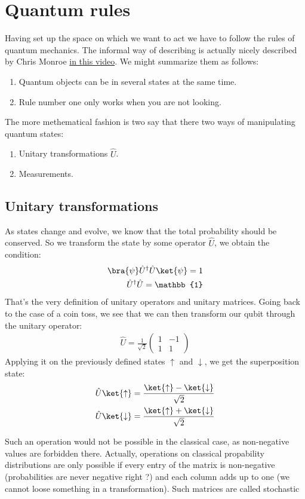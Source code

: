 \section{Quantum rules}
Having set up the space on which we want to act we have to follow the rules of quantum mechanics. The informal way of describing is actually nicely described by Chris Monroe \href{https://youtu.be/CC7nlBM2cSM}{in this video}. We might summarize them as follows:
\begin{enumerate}
\item Quantum objects can be in several states at the same time.
\item Rule number one only works when you are not looking.
\end{enumerate}

The more methematical fashion is two say that there two ways of manipulating quantum states:
\begin{enumerate}
\item Unitary transformations $\hat{U}$.
\item Measurements.
\end{enumerate}

\subsection{Unitary transformations}
As states change and evolve, we know that the total probability should be conserved. So we transform the state by some operator $\hat{U}$, we obtain the condition:
\begin{align}
\bra{\psi}\hat{U}^\dag\hat{U} \ket{\psi} = 1\\
\hat{U}^\dag\hat{U}  = \mathbb{1}
\end{align}
That's the very definition of unitary operators and unitary matrices.
Going back to the case of a coin toss, we see that we can then transform our qubit through the unitary operator:
\begin{align}
\hat{U}=\frac{1}{\sqrt{2}}\left(\begin{array}{cc}
1 & -1\\
1 & 1
\end{array}\right)
\end{align}
Applying it on the previously defined states $\uparrow$ and $\downarrow$, we get the superposition state:
\begin{align}
\hat{U}\ket{\uparrow} &= \frac{\ket{\uparrow}-\ket{\downarrow}}{\sqrt{2}}\\
\hat{U}\ket{\downarrow} &= \frac{\ket{\uparrow}+\ket{\downarrow}}{\sqrt{2}}
\end{align}

Such an operation would not be possible in the classical case, as non-negative values are forbidden there. Actually, operations on classical propability distributions are only possible if every entry of the matrix is non-negative (probabilities are never negative right ?) and each column adds up to one (we cannot loose something in a transformation). Such matrices are called stochastic